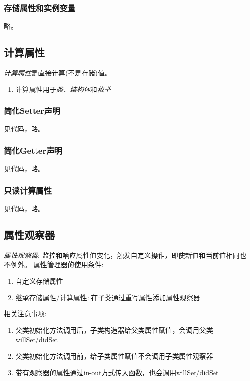 \documentclass{../main.tex}{subfiles}
\begin{document}
\subsubsection{存储属性和实例变量}
略。

\subsection{计算属性}
\emph{计算属性}是直接计算(不是存储)值。
\begin{enumerate}[itemsep=0pt, parsep=0pt, topsep=0pt, partopsep=0pt]
  \item 计算属性用于\emph{类}、\emph{结构体}和\emph{枚举}
\end{enumerate}
\subsubsection{简化Setter声明}
见代码，略。

\subsubsection{简化Getter声明}
见代码，略。

\subsubsection{只读计算属性}
见代码，略。

\subsection{属性观察器}
\emph{属性观察器}: 监控和响应属性值变化，触发自定义操作，即使新值和当前值相同也不例外。
属性管理器的使用条件:
\begin{enumerate}[itemsep=0pt, parsep=0pt, topsep=0pt, partopsep=0pt]
  \item 自定义存储属性
  \item 继承存储属性/计算属性: 在子类通过重写属性添加属性观察器
\end{enumerate}
相关注意事项:
\begin{enumerate}[itemsep=0pt, parsep=0pt, topsep=0pt, partopsep=0pt]
  \item 父类初始化方法调用后，子类构造器给父类属性赋值，会调用父类willSet/didSet
  \item 父类初始化方法调用前，给子类属性赋值不会调用子类属性观察器
  \item 带有观察器的属性通过in-out方式传入函数，也会调用willSet/didSet
\end{enumerate}
\end{document}
